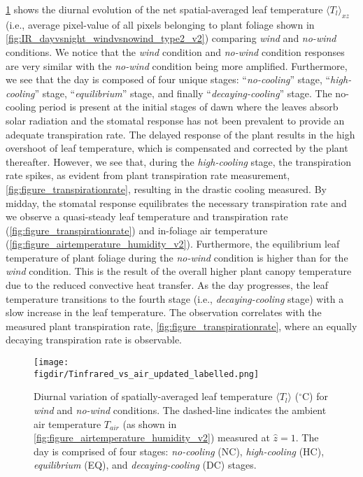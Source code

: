 \cref{fig:Tprofile_2} shows the diurnal evolution of the net spatial-averaged leaf temperature $\langle T_l \rangle_{\textit{xz}}$ (i.e., average pixel-value of all pixels belonging to plant foliage shown in \cref{fig:IR_dayvsnight_windvsnowind_type2_v2}) comparing \textit{wind} and \textit{no-wind} conditions. We notice that the \textit{wind} condition and \textit{no-wind} condition responses are very similar with the \textit{no-wind} condition being more amplified. Furthermore, we see that the day is composed of four unique stages: ``\textit{no-cooling}'' stage, ``\textit{high-cooling}'' stage, ``\textit{equilibrium}'' stage, and finally ``\textit{decaying-cooling}'' stage. The no-cooling period is present at the initial stages of dawn where the leaves absorb solar radiation and the stomatal response has not been prevalent to provide an adequate transpiration rate. The delayed response of the plant results in the high overshoot of leaf temperature, which is compensated and corrected by the plant thereafter. However, we see that, during the \textit{high-cooling} stage, the transpiration rate spikes, as evident from plant transpiration rate measurement, \cref{fig:figure_transpirationrate}, resulting in the drastic cooling measured. By midday, the stomatal response equilibrates the necessary transpiration rate and we observe a quasi-steady leaf temperature and transpiration rate (\cref{fig:figure_transpirationrate}) and in-foliage air temperature (\cref{fig:figure_airtemperature_humidity_v2}). Furthermore, the equilibrium leaf temperature of plant foliage during the \textit{no-wind} condition is higher than for the \textit{wind} condition. This is the result of the overall higher plant canopy temperature due to the reduced convective heat transfer. As the day progresses, the leaf temperature transitions to the fourth stage (i.e., \textit{decaying-cooling} stage) with a slow increase in the leaf temperature. The observation correlates with the measured plant transpiration rate, \cref{fig:figure_transpirationrate}, where an equally decaying transpiration rate is observable. 

	\begin{figure}[t]
	\centering
	\texttt{[image: \\figdir/Tinfrared\_vs\_air\_updated\_labelled.png]}
	\caption{Diurnal variation of spatially-averaged leaf temperature $\langle T_l \rangle$ ($^{\circ}$C) for \textit{wind} and \textit{no-wind} conditions. The dashed-line indicates the ambient air temperature $T_{\textit{air}}$ (as shown in \cref{fig:figure_airtemperature_humidity_v2}) measured at $\hat{z}=1$. The day is comprised of four stages: \textit{no-cooling} (NC), \textit{high-cooling} (HC), \textit{equilibrium} (EQ), and \textit{decaying-cooling} (DC) stages.}
	\label{fig:Tprofile_2}
	\end{figure}

